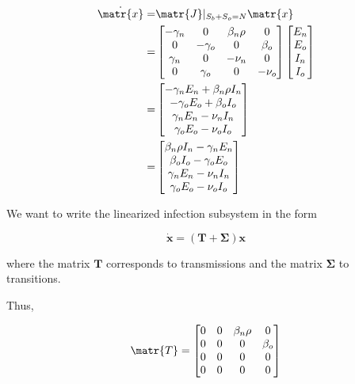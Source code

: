 \documentclass[11pt]{article}
\begin{document}
\begin{align*}
	\dot{\matr{x}} =& \matr{J}\rvert_{S_b + S_o = N} \matr{x}\\
	=& 
	\begin{bmatrix}
		-\gamma_n &	0	&	\beta_n \rho & 	0 \\
		0 & 	-\gamma_o & 0 & \beta_o \\
		\gamma_n & 0 & 	-\nu_n &		0	\\
		0 & 	\gamma_o & 	0 & -\nu_o \\
	 \end{bmatrix}
	\begin{bmatrix} E_n \\ E_o \\ I_n \\ I_o \end{bmatrix} \\
	=&
	\begin{bmatrix}
		-\gamma_n E_n + \beta_n \rho I_n\\
		-\gamma_o E_o + \beta_o I_o \\
		\gamma_n E_n -\nu_n I_n	\\
		\gamma_o E_o -\nu_o I_o \\
	\end{bmatrix}\\
	=&
	\begin{bmatrix}
		\beta_n \rho I_n - \gamma_n E_n\\
		\beta_o I_o -\gamma_o E_o \\
		\gamma_n E_n - \nu_n I_n	\\
		\gamma_o E_o - \nu_o I_o \\
	\end{bmatrix}
\end{align*}


We want to write the linearized infection subsystem in the form

\[ \dot{\bm{x}}=(\bm{T}+\bm{\Sigma}) \bm{x} \]

where the matrix \( \bm{T} \) corresponds to transmissions and the matrix \( \bm{\Sigma} \) to transitions.

Thus,

\[ \matr{T} = 
	\begin{bmatrix}
		0 &	0	&	\beta_n \rho & 	0 \\
		0 & 	0 & 0 & \beta_o \\
		0 & 0 & 	0 &		0	\\
		0 & 	0 & 	0 & 0 \\
	 \end{bmatrix} \]
\end{document}
